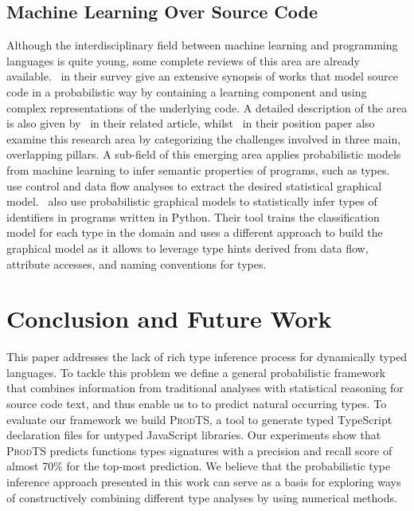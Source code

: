 \documentclass[sigplan,10pt,anonymous]{acmart} %
\newcommand{\prodts}{\textsc{ProdTS}\xspace}
\theoremstyle{plain}
\theoremstyle{remark}
\theoremstyle{definition}
\begin{document}
\subsection{Machine Learning Over Source Code}

Although the interdisciplinary field between machine learning and programming
languages is quite young, some complete reviews of this area are
already available.~\citet{allamanis17} in their survey give an extensive
synopsis of works that model source code in a probabilistic way by containing
a learning component and using complex representations of the underlying
code. A detailed description of the area is also given by~\citet{vechev16} in
their related article, whilst~\citet{threepillars}
in their position paper also examine this research area by categorizing
the challenges involved in three main, overlapping pillars. A sub-field of this
emerging area applies probabilistic models from machine learning to infer semantic
properties  of programs, such as types.
~\citet{chibotaru19} use control and data flow analyses to extract
the desired statistical graphical model.~\citet{xu16} also use probabilistic graphical models to statistically infer
types of identifiers in programs written in Python. Their tool trains the
classification model for each type in the domain and uses a different
approach to build the graphical model as it allows to leverage type hints
derived from data flow, attribute accesses, and naming conventions for types.




\section{Conclusion and Future Work} \label{sec:conclusion}
This paper addresses the lack of rich type inference process for
dynamically typed languages. To tackle this problem we define a
general probabilistic framework that combines
information from traditional analyses with statistical reasoning
for source code text, and thus enable us to to predict natural occurring
types. To evaluate our framework we build \prodts{}, a tool to
generate typed TypeScript declaration files for untyped JavaScript
libraries. Our experiments show that \prodts{} predicts functions types
signatures with a precision and recall score of almost 70\% for the top-most
prediction.
We believe that the probabilistic type inference approach presented
in this work can serve as a basis for exploring ways of constructively
combining different type analyses by using numerical methods.
\end{document}
